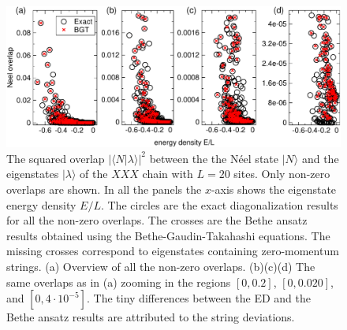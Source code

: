 \documentclass[11pt]{iopart}
\begin{document}
\begin{figure}[t]
\begin{center}
\includegraphics[width=.9\textwidth]{L20_BT_check}
\end{center}
\caption{ The squared overlap $|\langle N|\lambda\rangle|^2$ between the the 
 N\'eel state $|N\rangle$ and the eigenstates $|\lambda\rangle$ of the $XXX$ 
 chain with $L=20$ sites. Only non-zero overlaps are shown. In all the panels the 
 $x$-axis shows the eigenstate energy density $E/L$. The circles are the exact 
 diagonalization results for all the non-zero overlaps. The crosses are the Bethe 
 ansatz results obtained using the Bethe-Gaudin-Takahashi equations. The missing 
 crosses correspond to eigenstates containing zero-momentum strings. (a) Overview 
 of all the non-zero overlaps. (b)(c)(d) The same overlaps as in (a) zooming in 
 the regions $[0,0.2]$, $[0,0.020]$, and $[0,4\cdot 10^{-5}]$. The tiny differences 
 between the ED and the Bethe ansatz results are attributed to the string 
 deviations. 
}
\label{fig1-BGT-check}
\end{figure}
\end{document}
